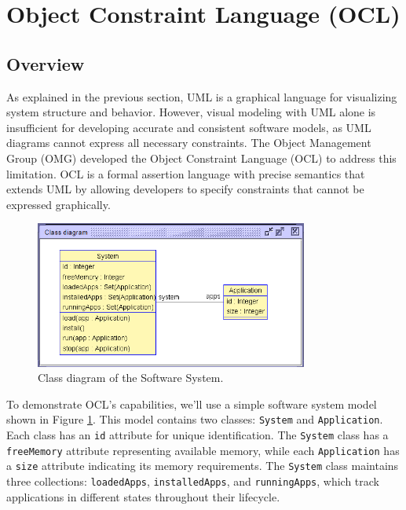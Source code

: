 \section{Object Constraint Language (OCL)}

\subsection{Overview}

\hspace{1cm} As explained in the previous section, UML is a graphical language for 
visualizing system structure and behavior. However, visual modeling with UML alone 
is insufficient for developing accurate and consistent software models, as UML 
diagrams cannot express all necessary constraints. The Object Management Group (OMG) 
developed the Object Constraint Language (OCL) to address this limitation. 
OCL is a formal assertion language with precise semantics that extends UML by 
allowing developers to specify constraints that cannot be expressed graphically. 

\begin{figure}
    \begin{center}
        \includegraphics[width=0.8\textwidth]{figures/c1/SoftwareSystem/SS_Ver2.png}
        \caption{Class diagram of the Software System.}
        \label{fig:class_diagram_software_system}
    \end{center}
\end{figure}

To demonstrate OCL's capabilities, we'll use a simple software system model shown 
in Figure \ref{fig:class_diagram_software_system}. This model contains two classes: 
\texttt{System} and \texttt{Application}. Each class has an \texttt{id} attribute 
for unique identification. The \texttt{System} class has a \texttt{freeMemory} attribute 
representing available memory, while each \texttt{Application} has a \texttt{size} 
attribute indicating its memory requirements. The \texttt{System} class maintains three 
collections: \texttt{loadedApps}, \texttt{installedApps}, and \texttt{runningApps}, which 
track applications in different states throughout their lifecycle.

